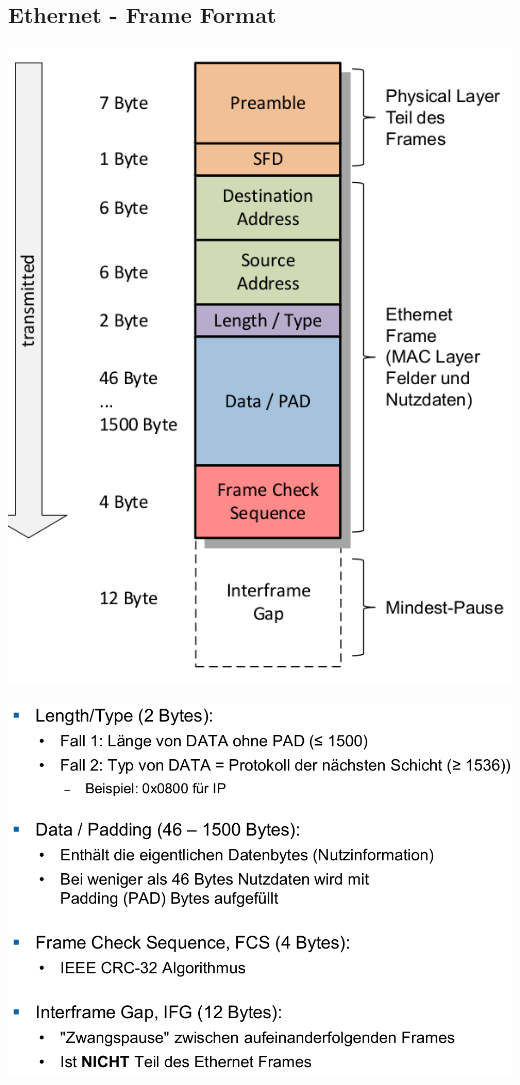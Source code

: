 \subsection{Ethernet - Frame Format}{
    \includegraphics[scale=.275]{img/E-Frame.png}

    \includegraphics[scale=.275]{img/E-2.png}
}



